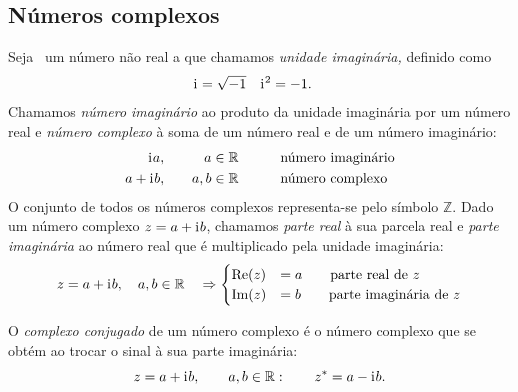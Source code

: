 \subsection{Números complexos}
Seja \iu~um número não real a que chamamos \emph{unidade imaginária,} definido
como
\begin{align*}
  \text{i}\mkern1mu&=\sqrt{-1}&\text{i}\mkern1mu^2&=-1.
\end{align*}
Chamamos \emph{número imaginário} ao produto da unidade imaginária por um número
real e \emph{número complexo} à soma de um número real e de um número
imaginário:
\begin{alignat*}{3}
  \text{i}\mkern1mu a,  &&\quad   a\in\mathbb{R} & \qquad &&\text{número imaginário}\\
  a+\text{i}\mkern1mu b,&&\quad a,b\in\mathbb{R} & \qquad &&\text{número complexo}
\end{alignat*}
O conjunto de todos os números complexos representa-se pelo símbolo
$\mathbb{Z}$. Dado um número complexo ${z}=a+\text{i}\mkern1mu b$, chamamos \emph{parte
real} à sua parcela real e \emph{parte imaginária} ao número real que é
multiplicado pela unidade imaginária:
\begin{equation*}
  {z}=a+\text{i}\mkern1mu b,\quad a,b\in\mathbb{R} \quad \Rightarrow
  \begin{cases}
    \text{Re}( z) &= a\qquad\text{parte real de } z\\
    \text{Im}( z) &= b\qquad\text{parte imaginária de } z
  \end{cases}
\end{equation*}

O \emph{complexo conjugado} de um número complexo é o número complexo que se
obtém ao trocar o sinal à sua parte imaginária:
\begin{equation*}
   z = a+\text{i}\mkern1mu b,\qquad a,b\in\mathbb{R}:\qquad  z^*=a-\text{i}\mkern1mu b.
\end{equation*}

